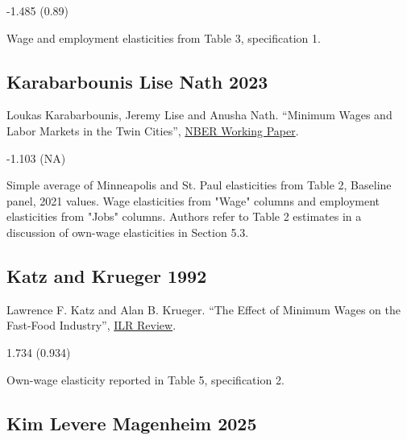 \vspace{0.7em}

 -1.485 (0.89)

\vspace{0.7em}

 Wage and employment elasticities from Table 3, specification 1.

\subsection*{Karabarbounis Lise Nath 2023}
\vspace{-0.7em}

\noindent Loukas Karabarbounis, Jeremy Lise and Anusha Nath. ``Minimum Wages and Labor Markets in the Twin Cities'', \href{https://www.nber.org/system/files/working_papers/w30239/w30239.pdf}{NBER Working Paper}.

\vspace{0.7em}

 -1.103 (NA)

\vspace{0.7em}

 Simple average of Minneapolis and St. Paul elasticities from Table 2, Baseline panel, 2021 values. Wage elasticities from "Wage" columns and employment elasticities from "Jobs" columns. Authors refer to Table 2 estimates in a discussion of own-wage elasticities in Section 5.3.

\subsection*{Katz and Krueger 1992}
\vspace{-0.7em}

\noindent Lawrence F. Katz and Alan B. Krueger. ``The Effect of Minimum Wages on the Fast-Food Industry'', \href{https://doi.org/10.1177/001979399204600102}{ILR Review}.

\vspace{0.7em}

 1.734 (0.934)

\vspace{0.7em}

 Own-wage elasticity reported in Table 5, specification 2.

\subsection*{Kim Levere Magenheim 2025}
\vspace{-0.7em}

